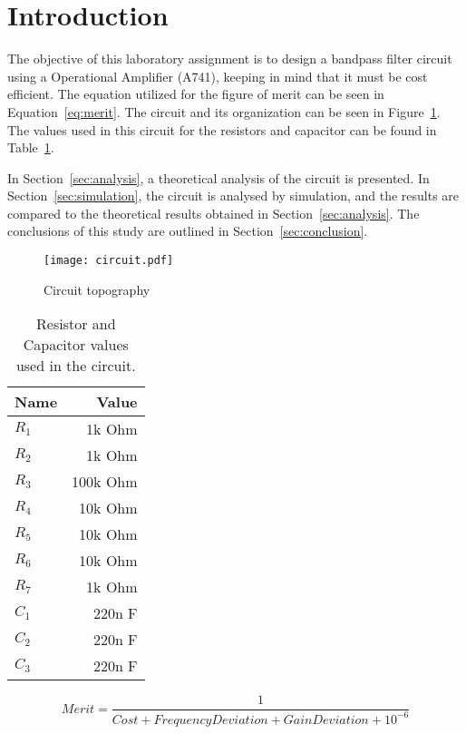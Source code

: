 \section{Introduction}
\label{sec:introduction}

\tab The objective of this laboratory assignment is to design a bandpass filter circuit using a Operational Amplifier (A741), keeping in mind that it must be cost efficient. The equation utilized for the figure of merit can be seen in Equation~\ref{eq:merit}.
The circuit and its organization can be seen in Figure~\ref{fig:circuit}.
The values used in this circuit for the resistors and capacitor can be found in Table~\ref{tab:values}.

In Section~\ref{sec:analysis}, a theoretical analysis of the circuit is
presented. In Section~\ref{sec:simulation}, the circuit is analysed by
simulation, and the results are compared to the theoretical results obtained in
Section~\ref{sec:analysis}. The conclusions of this study are outlined in
Section~\ref{sec:conclusion}.
\\[1cm]
\begin{figure}[h] \centering
\texttt{[image: circuit.pdf]}
\caption{Circuit topography}
\label{fig:circuit}
\end{figure}

\begin{table}[H]
  \centering
  \begin{tabular}{|l|r|}
    \hline    
    {\bf Name} & {\bf Value} \\ \hline
    $R_1$ & 1k Ohm \\ \hline
    $R_2$ & 1k Ohm \\ \hline
    $R_3$ & 100k Ohm \\ \hline
    $R_4$ & 10k Ohm \\ \hline
    $R_5$ & 10k Ohm \\ \hline
    $R_6$ & 10k Ohm \\ \hline	
    $R_7$ & 1k Ohm \\ \hline	
    $C_1$ & 220n F \\ \hline
    $C_2$ & 220n F \\ \hline
    $C_3$ & 220n F \\ \hline	
  \end{tabular}
  \caption{Resistor and Capacitor values used in the circuit.}
  \label{tab:values}
\end{table}

\begin{equation}
	Merit = \frac{1}{Cost+Frequency Deviation + Gain Deviation + 10^{-6}}
\label{eq:merit}
\end{equation}
